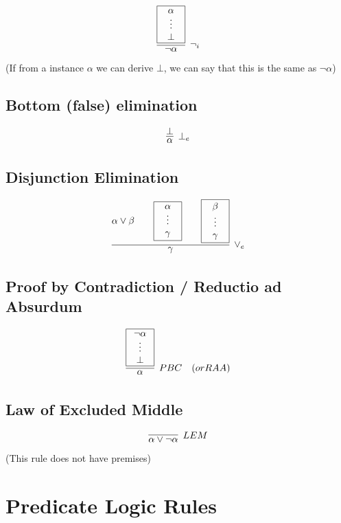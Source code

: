 \documentclass{article}
\newcommand{\rulename}[1]{#1}
\begin{document}
    \begin{align*}
      \infer[\rulename{\neg_i}]
      {\neg \alpha}
      {
        \framebox{\parbox{.8cm}{\centerline{$\alpha$}\centerline{$\vdots$}\centerline{$\bot$}}}
      }
    \end{align*}
    (If from a instance $\alpha$ we can derive $\bot$, we can say that this is the same as $\neg\alpha$)
    
\subsection*{Bottom (false) elimination}
    \begin{align*}
      \infer[\rulename{\bot_e}]
      {\alpha}
      {\bot}
    \end{align*}
    
\subsection*{Disjunction Elimination}
    \begin{align*}
      \infer[\rulename{\vee_e}]
      {\gamma}
      {
        \alpha \vee \beta && 
        \framebox{\parbox{.8cm}{\centerline{$\alpha$}\centerline{$\vdots$}\centerline{$\gamma$}}} 
        &&
        \framebox{\parbox{.8cm}{\centerline{$\beta$}\centerline{$\vdots$}\centerline{$\gamma$}}} 
      }
    \end{align*}

\subsection*{Proof by Contradiction / Reductio ad Absurdum}
    \begin{align*}
        \infer[\rulename{PBC} \quad (or \rulename{RAA})]
      {\alpha}
      {\framebox{\parbox{.8cm}{\centerline{$\neg\alpha$}\centerline{$\vdots$}\centerline{$\bot$}}}}
    \end{align*}

\subsection*{Law of Excluded Middle}
    \vspace{3ex}
    \begin{align*}
       \infer[\rulename{LEM}]
      {\alpha \vee \neg \alpha}
      {
      } 
    \end{align*}
    (This rule does not have premises)
    
\section*{Predicate Logic Rules}
\end{document}
